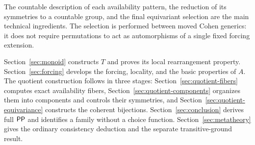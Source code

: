 The countable description of each availability pattern, the reduction of
its symmetries to a countable group, and the final equivariant selection
are the main technical ingredients. The selection is performed between
moved Cohen generics: it does not require permutations to act as
automorphisms of a single fixed forcing extension.

Section~\ref{sec:monoid} constructs $T$ and proves its local rearrangement
property. Section~\ref{sec:forcing} develops the forcing, locality, and the
basic properties of $A$. The quotient construction follows in
three stages: Section~\ref{sec:quotient-fibers} computes exact availability
fibers, Section~\ref{sec:quotient-components} organizes them into components
and controls their symmetries, and Section~\ref{sec:quotient-equivariance}
constructs the coherent bijections. Section~\ref{sec:conclusion} derives
full $\mathsf{PP}$ and identifies a family without a choice function.
Section~\ref{sec:metatheory} gives the ordinary consistency deduction and
the separate transitive-ground result.
